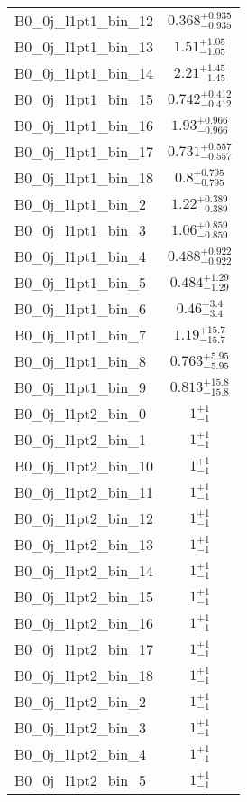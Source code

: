 \begin{tabular}{|l|c|}
B0\_0j\_l1pt1\_bin\_12 & $0.368^{+0.935}_{-0.935}$ \\
B0\_0j\_l1pt1\_bin\_13 & $1.51^{+1.05}_{-1.05}$ \\
B0\_0j\_l1pt1\_bin\_14 & $2.21^{+1.45}_{-1.45}$ \\
B0\_0j\_l1pt1\_bin\_15 & $0.742^{+0.412}_{-0.412}$ \\
B0\_0j\_l1pt1\_bin\_16 & $1.93^{+0.966}_{-0.966}$ \\
B0\_0j\_l1pt1\_bin\_17 & $0.731^{+0.557}_{-0.557}$ \\
B0\_0j\_l1pt1\_bin\_18 & $0.8^{+0.795}_{-0.795}$ \\
B0\_0j\_l1pt1\_bin\_2 & $1.22^{+0.389}_{-0.389}$ \\
B0\_0j\_l1pt1\_bin\_3 & $1.06^{+0.859}_{-0.859}$ \\
B0\_0j\_l1pt1\_bin\_4 & $0.488^{+0.922}_{-0.922}$ \\
B0\_0j\_l1pt1\_bin\_5 & $0.484^{+1.29}_{-1.29}$ \\
B0\_0j\_l1pt1\_bin\_6 & $0.46^{+3.4}_{-3.4}$ \\
B0\_0j\_l1pt1\_bin\_7 & $1.19^{+15.7}_{-15.7}$ \\
B0\_0j\_l1pt1\_bin\_8 & $0.763^{+5.95}_{-5.95}$ \\
B0\_0j\_l1pt1\_bin\_9 & $0.813^{+15.8}_{-15.8}$ \\
B0\_0j\_l1pt2\_bin\_0 & $1^{+1}_{-1}$ \\
B0\_0j\_l1pt2\_bin\_1 & $1^{+1}_{-1}$ \\
B0\_0j\_l1pt2\_bin\_10 & $1^{+1}_{-1}$ \\
B0\_0j\_l1pt2\_bin\_11 & $1^{+1}_{-1}$ \\
B0\_0j\_l1pt2\_bin\_12 & $1^{+1}_{-1}$ \\
B0\_0j\_l1pt2\_bin\_13 & $1^{+1}_{-1}$ \\
B0\_0j\_l1pt2\_bin\_14 & $1^{+1}_{-1}$ \\
B0\_0j\_l1pt2\_bin\_15 & $1^{+1}_{-1}$ \\
B0\_0j\_l1pt2\_bin\_16 & $1^{+1}_{-1}$ \\
B0\_0j\_l1pt2\_bin\_17 & $1^{+1}_{-1}$ \\
B0\_0j\_l1pt2\_bin\_18 & $1^{+1}_{-1}$ \\
B0\_0j\_l1pt2\_bin\_2 & $1^{+1}_{-1}$ \\
B0\_0j\_l1pt2\_bin\_3 & $1^{+1}_{-1}$ \\
B0\_0j\_l1pt2\_bin\_4 & $1^{+1}_{-1}$ \\
B0\_0j\_l1pt2\_bin\_5 & $1^{+1}_{-1}$ \\

\end{tabular}
